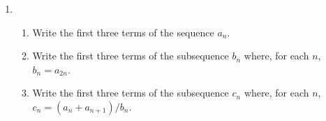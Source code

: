 \documentclass[12 pt]{article}
\begin{document}
\begin{enumerate}[leftmargin=0in, rightmargin=-0.25in]
	\item %
	\begin{enumerate}
		\item Write the first three terms of the sequence $a_n$.\\
			\vspace{-4.5mm}
		\item Write the first three terms of the subsequence $b_n$ where, for each $n$, $b_n=a_{2n}$.\\
			\vspace{-4.5mm}
		\item Write the first three terms of the subsequence $c_n$ where, for each $n$, $c_n=(a_n+a_{n+1})/b_n$.\\
	\end{enumerate}


\end{enumerate}
\end{document}
